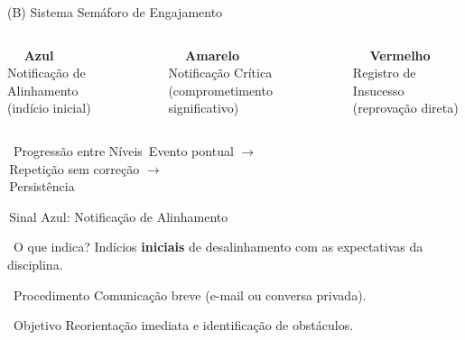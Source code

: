 \documentclass[xcolor=dvipsnames,table]{beamer}
\newcommand{\sazul}{\textcolor{NavyBlue}{\faCircle}\,}
\newcommand{\samarelo}{\textcolor{Goldenrod}{\faCircle}\,}
\newcommand{\svermelho}{\textcolor{BrickRed}{\faCircle}\,}
\begin{document}
  \begin{frame}{(B) Sistema Semáforo de Engajamento}
    \begin{columns}
      \begin{block}{\centering \textcolor{NavyBlue}{\faCircle\ \faCircle\ \faCircle}}
        \centering \small \textbf{Azul}\\[3pt]
        Notificação de Alinhamento\\(indício inicial)
      \end{block}
      \begin{alertblock}{\centering \textcolor{Goldenrod}{\faCircle\ \faCircle\ \faCircle}}
        \centering \small \textbf{Amarelo}\\[3pt]
        Notificação Crítica\\(comprometimento significativo)
      \end{alertblock}
      \begin{block}{\centering \textcolor{BrickRed}{\faCircle\ \faCircle\ \faCircle}}
        \centering \small \textbf{Vermelho}\\[3pt]
        Registro de Insucesso\\(reprovação direta)
      \end{block}
    \end{columns}
    \pause
    \vspace{0.7em}
    \begin{exampleblock}{\centering \faRedoAlt\ Progressão entre Níveis}
      \centering
      \sazul Evento pontual
      \; $\longrightarrow$ \;
      \\\samarelo Repetição sem correção
      \; $\longrightarrow$ \;
      \\\svermelho Persistência
    \end{exampleblock}
  \end{frame}

  \begin{frame}{\sazul Sinal Azul: Notificação de Alinhamento}
    \begin{block}{\faSearch\ O que indica?}
      Indícios \textbf{iniciais} de desalinhamento com as expectativas da disciplina.
    \end{block}
    \pause
    \begin{block}{\faEnvelope\ Procedimento}
      Comunicação breve (e-mail ou conversa privada).
    \end{block}
    \pause
    \begin{exampleblock}{\faBullseye\ Objetivo}
      Reorientação imediata e identificação de obstáculos.
    \end{exampleblock}
  \end{frame}
\end{document}
